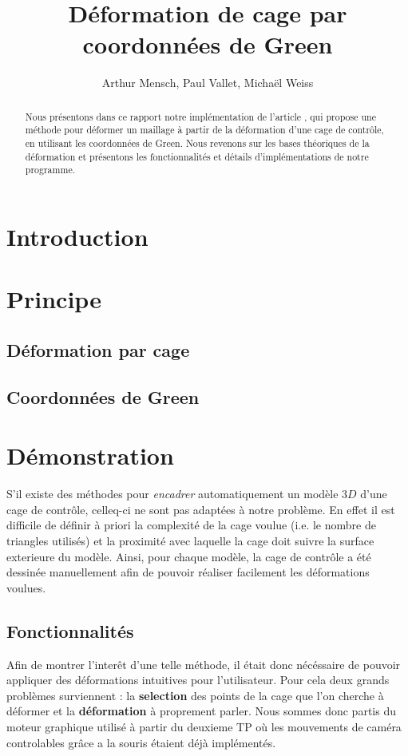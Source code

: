 \documentclass[10pt,a4paper]{article}
\author{Arthur Mensch, Paul Vallet, Michaël Weiss}
\title{Déformation de cage par coordonnées de Green}
\begin{document}
\maketitle
\begin{abstract}
Nous présentons dans ce rapport notre implémentation de l'article \cite{lipman2008green}, qui propose une méthode pour déformer un maillage à partir de la déformation d'une cage de contrôle, en utilisant les coordonnées de Green. Nous revenons sur les bases théoriques de la déformation et présentons les fonctionnalités et détails d'implémentations de notre programme.
\end{abstract}
\section*{Introduction}



\section{Principe}

\subsection{Déformation par cage}

\subsection{Coordonnées de Green}

\section{Démonstration}
S'il existe des méthodes pour \textit{encadrer} automatiquement un modèle $3D$ d'une cage de contrôle, celleq-ci ne sont pas adaptées à notre problème. En effet il est difficile de définir à  priori la complexité de la cage voulue (i.e. le nombre de triangles utilisés) et la proximité avec laquelle la cage doit suivre la surface exterieure du modèle. Ainsi, pour chaque modèle, la cage de contrôle a été dessinée manuellement afin de pouvoir réaliser facilement les déformations voulues.
 
\subsection{Fonctionnalités}
Afin de montrer l'interêt d'une telle méthode, il était donc nécéssaire de pouvoir appliquer des déformations intuitives pour l'utilisateur. Pour cela deux grands problèmes surviennent : la \textbf{selection} des points de la cage que l'on cherche à déformer et la \textbf{déformation} à proprement parler. Nous sommes donc partis du moteur graphique utilisé à partir du deuxieme TP où les mouvements de caméra controlables grâce a la souris étaient déjà implémentés.
\end{document}
